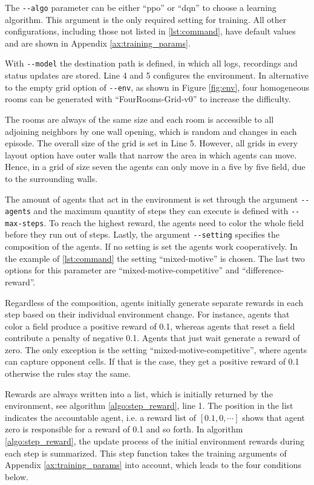 The \verb|--algo| parameter can be either ``ppo'' or ``dqn'' to choose a learning algorithm. This argument is the only required setting for training. All other configurations, including those not listed in \ref{lst:command}, have default values and are shown in Appendix \ref{ax:training_params}.

With \verb|--model| the destination path is defined, in which all logs, recordings and status updates are stored. Line 4 and 5 configures the environment. In alternative to the empty grid option of \verb|--env|, as shown in Figure \ref{fig:env}, four homogeneous rooms can be generated with ``FourRooms-Grid-v0'' to increase the difficulty. 

The rooms are always of the same size and each room is accessible to all adjoining neighbors by one wall opening, which is random and changes in each episode. The overall size of the grid is set in Line 5. However, all grids in every layout option have outer walls that narrow the area in which agents can move. Hence, in a grid of size seven the agents can only move in a five by five field, due to the surrounding walls.

The amount of agents that act in the environment is set through the argument \verb|--agents| and the maximum quantity of steps they can execute is defined with \verb|--max-steps|. To reach the highest reward, the agents need to color the whole field before they run out of steps. Lastly, the argument \verb|--setting| specifies the composition of the agents. If no setting is set the agents work cooperatively. In the example of \ref{lst:command} the setting ``mixed-motive'' is chosen. The last two options for this parameter are ``mixed-motive-competitive'' and ``difference-reward''.

Regardless of the composition, agents initially generate separate rewards in each step based on their individual environment change. For instance, agents that color a field produce a positive reward of 0.1, whereas agents that reset a field contribute a penalty of negative 0.1. Agents that just wait generate a reward of zero. The only exception is the setting ``mixed-motive-competitive'', where agents can capture opponent cells. If that is the case, they get a positive reward of 0.1 otherwise the rules stay the same. 

Rewards are always written into a list, which is initially returned by the environment, see algorithm \ref{algo:step_reward}, line 1. The position in the list indicates the accountable agent, i.e. a reward list of $[0.1, 0, \cdots ]$ shows that agent zero is responsible for a reward of 0.1 and so forth. In algorithm \ref{algo:step_reward}, the update process of the initial environment rewards during each step is summarized. This step function takes the training arguments of Appendix \ref{ax:training_params} into account, which leads to the four conditions below.


